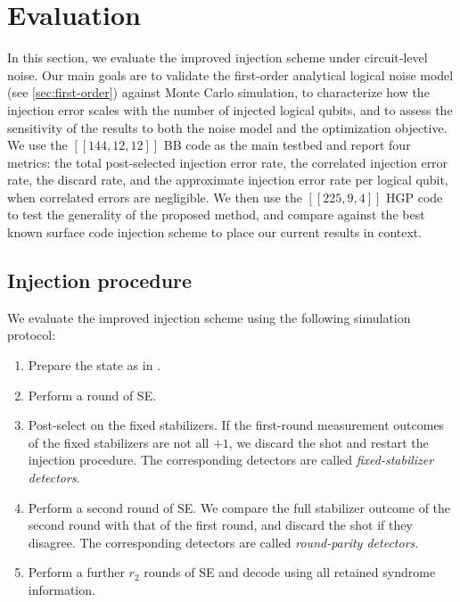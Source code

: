 \section{Evaluation}
\label{sec:evaluation}

In this section, we evaluate the improved injection scheme under circuit-level noise. Our main goals are to validate the first-order analytical logical noise model (see \cref{sec:first-order}) against Monte Carlo simulation, to characterize how the injection error scales with the number of injected logical qubits, and to assess the sensitivity of the results to both the noise model and the optimization objective. We use the $[[144,12,12]]$ BB code as the main testbed and report four metrics: the total post-selected injection error rate, the correlated injection error rate, the discard rate, and the approximate injection error rate per logical qubit, when correlated errors are negligible. We then use the $[[225,9,4]]$ HGP code to test the generality of the proposed method, and compare against the best known surface code injection scheme to place our current results in context.

\subsection{Injection procedure}

We evaluate the improved injection scheme using the following simulation protocol:
\begin{enumerate}
    \item Prepare the state as in .
    \item Perform a round of SE.
    \item Post-select on the fixed stabilizers. If the first-round measurement outcomes of the fixed stabilizers are not all $+1$, we discard the shot and restart the injection procedure. The corresponding detectors are called \emph{fixed-stabilizer detectors}.
    \item Perform a second round of SE. We compare the full stabilizer outcome of the second round with that of the first round, and discard the shot if they disagree. The corresponding detectors are called \emph{round-parity detectors}.
    \item Perform a further $r_2$ rounds of SE and decode using all retained syndrome information.
\end{enumerate}

